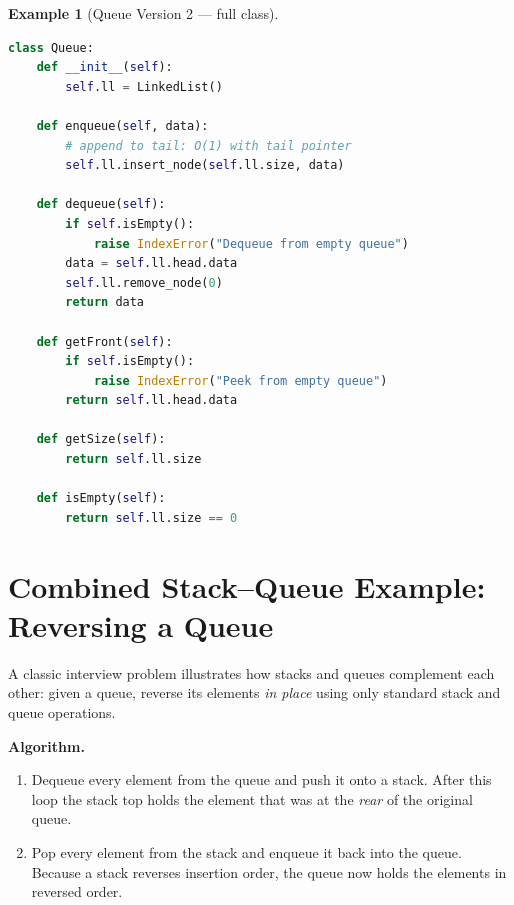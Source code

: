 \documentclass[11pt, a4paper, notitlepage]{report}
\theoremstyle{definition}
\theoremstyle{remark}
\theoremstyle{definition}
\newtheorem{example}[theorem]{Example}
\begin{document}
\begin{example}[Queue Version 2 --- full class]
\label{ex:queue-v2-full}
\leavevmode
\begin{lstlisting}[language=Python]
class Queue:
    def __init__(self):
        self.ll = LinkedList()

    def enqueue(self, data):
        # append to tail: O(1) with tail pointer
        self.ll.insert_node(self.ll.size, data)

    def dequeue(self):
        if self.isEmpty():
            raise IndexError("Dequeue from empty queue")
        data = self.ll.head.data
        self.ll.remove_node(0)
        return data

    def getFront(self):
        if self.isEmpty():
            raise IndexError("Peek from empty queue")
        return self.ll.head.data

    def getSize(self):
        return self.ll.size

    def isEmpty(self):
        return self.ll.size == 0
\end{lstlisting}
\end{example}


\section{Combined Stack--Queue Example: Reversing a Queue}
\label{sec:queue-reverse}

A classic interview problem illustrates how stacks and queues complement each other: given a
queue, reverse its elements \emph{in place} using only standard stack and queue operations.

\textbf{Algorithm.}
\begin{enumerate}
  \item Dequeue every element from the queue and push it onto a stack.  After this loop the
        stack top holds the element that was at the \emph{rear} of the original queue.
  \item Pop every element from the stack and enqueue it back into the queue.  Because a stack
        reverses insertion order, the queue now holds the elements in reversed order.
\end{enumerate}
\end{document}
